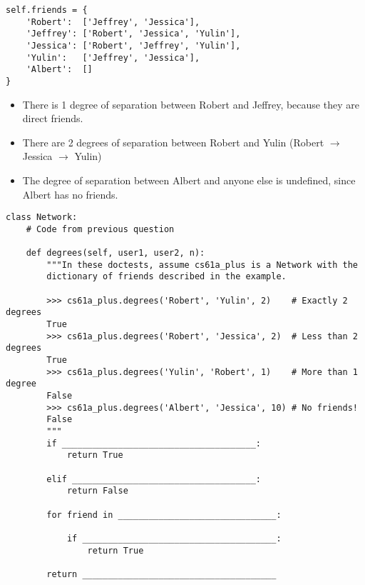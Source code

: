 \begin{lstlisting}
self.friends = {
    'Robert':  ['Jeffrey', 'Jessica'],
    'Jeffrey': ['Robert', 'Jessica', 'Yulin'],
    'Jessica': ['Robert', 'Jeffrey', 'Yulin'],
    'Yulin':   ['Jeffrey', 'Jessica'],
    'Albert':  []
}
\end{lstlisting}

\begin{itemize}
    \item There is 1 degree of separation between Robert and Jeffrey, because they
        are direct friends.
    \item There are 2 degrees of separation between Robert and Yulin (Robert
        $\rightarrow$ Jessica $\rightarrow$ Yulin)
    \item The degree of separation between Albert and anyone else is undefined,
        since Albert has no friends.
\end{itemize}

\begin{lstlisting}
class Network:
    # Code from previous question

    def degrees(self, user1, user2, n):
        """In these doctests, assume cs61a_plus is a Network with the
        dictionary of friends described in the example.

        >>> cs61a_plus.degrees('Robert', 'Yulin', 2)    # Exactly 2 degrees
        True
        >>> cs61a_plus.degrees('Robert', 'Jessica', 2)  # Less than 2 degrees
        True
        >>> cs61a_plus.degrees('Yulin', 'Robert', 1)    # More than 1 degree
        False
        >>> cs61a_plus.degrees('Albert', 'Jessica', 10) # No friends!
        False
        """
        if ______________________________________:
            return True

        elif ____________________________________:
            return False

        for friend in _______________________________:

            if ______________________________________:
                return True

        return ______________________________________
\end{lstlisting}

